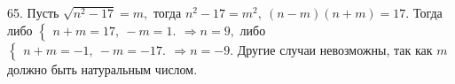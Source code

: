 65. Пусть $\sqrt{n^2-17}=m,$ тогда $n^2-17=m^2,\ (n-m)(n+m)=17.$ Тогда либо $\begin{cases}n+m=17,\
-m=1.\end{cases}\Rightarrow n=9,$ либо $
\begin{cases}n+m=-1,\
-m=-17.\end{cases}\Rightarrow n=-9.$ Другие случаи невозможны, так как $m$ должно быть натуральным числом.\\
